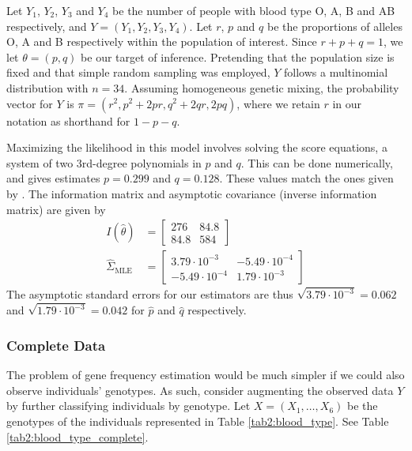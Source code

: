 \documentclass[11pt, oneside]{article}   	%
\begin{document}
Let $Y_1$, $Y_2$, $Y_3$ and $Y_4$ be the number of people with blood type O, A, B and AB respectively, and $Y = (Y_1, Y_2, Y_3, Y_4)$. Let $r$, $p$ and $q$ be the proportions of alleles O, A and B respectively within the population of interest. Since $r + p + q = 1$, we let $\theta = (p, q)$ be our target of inference. Pretending that the population size is fixed and that simple random sampling was employed, $Y$ follows a multinomial distribution with $n = 34$. Assuming homogeneous genetic mixing, the probability vector for $Y$ is $\pi = (r^2, p^2 + 2pr, q^2 + 2qr, 2pq)$, where we retain $r$ in our notation as shorthand for $1 - p - q$.

Maximizing the likelihood in this model involves solving the score equations, a system of two 3rd-degree polynomials in $p$ and $q$. This can be done numerically, and gives estimates $p = 0.299$ and $q = 0.128$. These values match the ones given by \citet{Fuj78}. The information matrix and asymptotic covariance (inverse information matrix) are given by
%
\begin{align}
    I(\hat{\theta}) &= \begin{bmatrix}
        276 & 84.8\\
        84.8 & 584
    \end{bmatrix}\\
    \hat{\Sigma}_\mathrm{MLE} &= \begin{bmatrix}
        3.79 \cdot 10^{-3} & -5.49 \cdot 10^{-4}\\
        -5.49 \cdot 10^{-4} & 1.79 \cdot 10^{-3}
    \end{bmatrix} \label{eq:obs_lik_SE}
\end{align}
%
The asymptotic standard errors for our estimators are thus $\sqrt{3.79 \cdot 10^{-3}} = 0.062$ and $\sqrt{1.79 \cdot 10^{-3}} = 0.042$ for $\hat{p}$ and $\hat{q}$ respectively.

\subsubsection{Complete Data}

The problem of gene frequency estimation would be much simpler if we could also observe individuals' genotypes. As such, consider augmenting the observed data $Y$ by further classifying individuals by genotype. Let $X = (X_1, \ldots, X_6)$ be the genotypes of the individuals represented in Table \ref{tab2:blood_type}. See Table \ref{tab2:blood_type_complete}.
\end{document}
